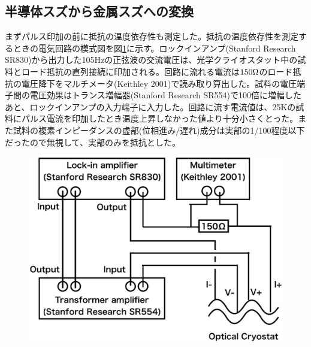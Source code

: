 \subsection{半導体スズから金属スズへの変換}
まずパルス印加の前に抵抗の温度依存性も測定した。抵抗の温度依存性を測定するときの電気回路の模式図を図\ref{fig:schematics_lockin}に示す。ロックインアンプ(Stanford Research SR830)から出力した105Hzの正弦波の交流電圧は、光学クライオスタット中の試料とロード抵抗の直列接続に印加される。回路に流れる電流は$\rm 150\Omega$のロード抵抗の電圧降下をマルチメータ(Keithley 2001)で読み取り算出した。試料の電圧端子間の電圧効果はトランス増幅器(Stanford Research SR554)で100倍に増幅したあと、ロックインアンプの入力端子に入力した。回路に流す電流値は、25Kの試料にパルス電流を印加したとき温度上昇しなかった値より十分小さくとった。また試料の複素インピーダンスの虚部(位相進み/遅れ)成分は実部の1/100程度以下だったので無視して、実部のみを抵抗とした。
\begin{figure}[!h]
     \begin{center}
   \includegraphics[width=0.5\hsize]{experiment/schematics_lockin.eps}
  \end{center}
  \caption{}
  \label{fig:schematics_lockin}
\end{figure}


